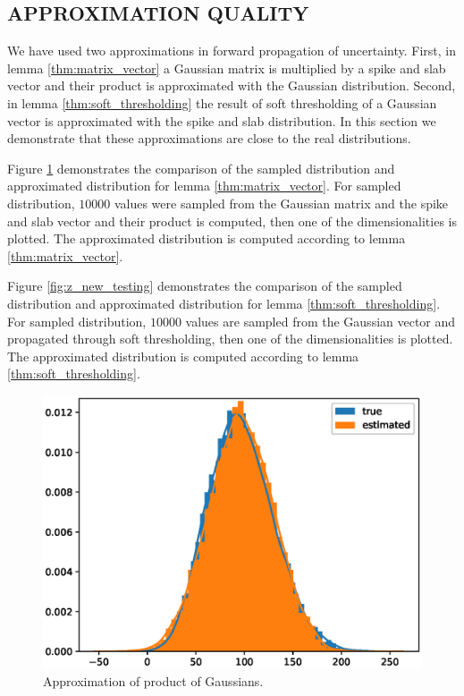 \documentclass[letterpaper]{article}
\begin{document}
\subsection{\uppercase{Approximation quality}}
\label{sec:approx_quality}
We have used two approximations in forward propagation of uncertainty. First, in lemma \ref{thm:matrix_vector} a Gaussian matrix is multiplied by a spike and slab vector and their product is approximated with the Gaussian distribution. Second, in lemma \ref{thm:soft_thresholding} the result of soft thresholding of a Gaussian vector is approximated with the spike and slab distribution. In this section we demonstrate that these approximations are close to the real distributions.

Figure \ref{fig:d_testing} demonstrates the comparison of the sampled distribution and approximated distribution for lemma \ref{thm:matrix_vector}. For sampled distribution, $10000$ values were sampled from the Gaussian matrix and the spike and slab vector and their product is computed, then one of the dimensionalities is plotted. The approximated distribution is computed according to lemma \ref{thm:matrix_vector}.

Figure \ref{fig:z_new_testing} demonstrates the comparison of the sampled distribution and approximated distribution for lemma \ref{thm:soft_thresholding}. For sampled distribution, $10000$ values are sampled from the Gaussian vector and propagated through soft thresholding, then one of the dimensionalities is plotted. The approximated distribution is computed according to lemma \ref{thm:soft_thresholding}.
\begin{figure}[t]
\includegraphics[width=\columnwidth]{d_testing}
\caption{Approximation of product of Gaussians.}
\label{fig:d_testing}
\end{figure}
\end{document}
